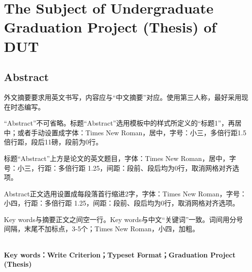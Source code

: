 	\section*{\textbf{ {The Subject of Undergraduate Graduation Project (Thesis) of DUT}}}
	\begin{spacing}{1.6}
		\section*{ {Abstract}}
	\end{spacing}
	{\songti 外文摘要要求用英文书写，内容应与“中文摘要”对应。使用第三人称，最好采用现在时态编写。\par 
	“Abstract”不可省略。标题“Abstract”选用模板中的样式所定义的“标题1”，再居中；或者手动设置成字体：Times New Roman，居中，字号：小三，多倍行距1.5倍行距，段后11磅，段前为0行。\par 
	标题“Abstract”上方是论文的英文题目，字体：Times New Roman，居中，字号：小三，行距：多倍行距 1.25，间距：段前、段后均为0行，取消网格对齐选项。\par 
	Abstract正文选用设置成每段落首行缩进2字，字体：Times New Roman，字号：小四，行距：多倍行距 1.25，间距：段前、段后均为0行，取消网格对齐选项。\par 
	Key words与摘要正文之间空一行。Key words与中文“关键词”一致。词间用分号间隔，末尾不加标点，3-5个；Times New Roman，小四，加粗。\par 
	\quad \\
	{\textbf{ Key words：Write Criterion；Typeset Format；Graduation Project (Thesis)} }}
	
